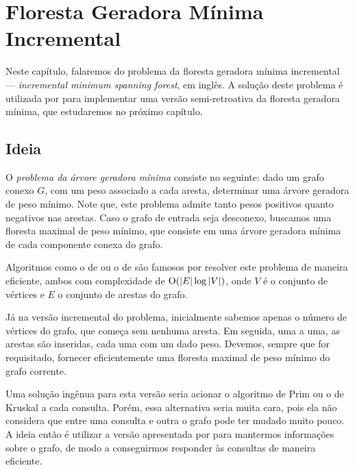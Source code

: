 
\chapter{Floresta Geradora Mínima Incremental}
\label{cap:incremental-msf}

Neste capítulo, falaremos do problema da floresta geradora mínima incremental --- \emph{incremental minimum spanning forest}, em inglês. A solução deste problema é utilizada por \citet{10.1093/comjnl/bxaa135} para implementar uma versão semi-retroativa da floresta geradora mínima, que estudaremos no próximo capítulo.

\section{Ideia}
\label{sec:imsf-ideia}

O \emph{problema da árvore geradora mínima} consiste no seguinte: dado um grafo conexo $G$, com um peso associado a cada aresta, determinar uma árvore geradora de peso mínimo. Note que, este problema admite tanto pesos positivos quanto negativos nas arestas. Caso o grafo de entrada seja desconexo, buscamos uma floresta maximal de peso mínimo, que consiste em uma árvore geradora mínima de cada componente conexa do grafo.

Algoritmos como o de \citet{6773228} ou o de \citet{kruskal1956shortest} são famosos por resolver este problema de maneira eficiente, ambos com complexidade de $\mathrm{O}(|E| \log |V|)$, onde $V$ é o conjunto de vértices e $E$ o conjunto de arestas do grafo.

Já na versão incremental do problema, inicialmente sabemos apenas o número de vértices do grafo, que começa sem nenhuma aresta. Em seguida, uma a uma, as arestas são inseridas, cada uma com um dado peso. Devemos, sempre que for requisitado, fornecer eficientemente uma floresta maximal de peso mínimo do grafo corrente.

Uma solução ingênua para esta versão seria acionar o algoritmo de Prim ou o de Kruskal a cada consulta. Porém, essa alternativa seria muita cara, pois ela não considera que entre uma consulta e outra o grafo pode ter mudado muito pouco. A ideia então é utilizar a versão apresentada por \citet{frederickson1985data} para mantermos informações sobre o grafo, de modo a conseguirmos responder às consultas de maneira eficiente.

